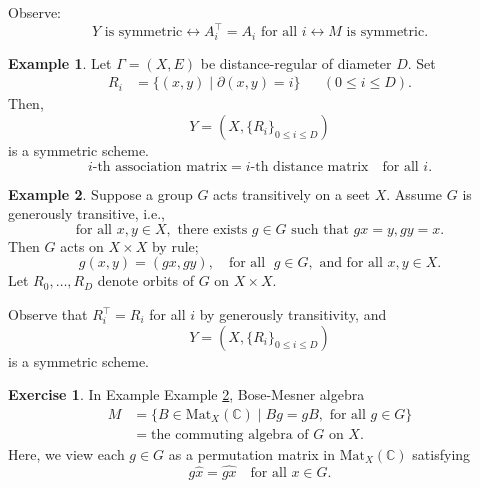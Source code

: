 \documentclass[
]{book}
\theoremstyle{definition}
\theoremstyle{definition}
\newtheorem{example}{Example}[chapter]
\theoremstyle{definition}
\newtheorem{exercise}{Exercise}[chapter]
\theoremstyle{definition}
\theoremstyle{remark}
\begin{document}
Observe:
\[Y \text{ is symmetric} \leftrightarrow A_i^\top = A_i \text{ for all } i \leftrightarrow M \text{ is symmetric}.\]

\begin{example}
\protect\hypertarget{exm:dr}{}\label{exm:dr}Let \(\Gamma = (X, E)\) be distance-regular of diameter \(D\). Set
\begin{align}
R_i & = \{(x,y)\mid \partial(x,y) = i\} && (0\leq i\leq D).
\end{align}
Then,
\[Y = (X, \{R_i\}_{0\leq i\leq D})\]
is a symmetric scheme.
\[i\text{-th association matrix} = i\text{-th distance matrix} \quad \text{for all $i$.}\]
\end{example}

\begin{example}
\protect\hypertarget{exm:gen-tr}{}\label{exm:gen-tr}Suppose a group \(G\) acts transitively on a seet \(X\). Assume \(G\) is generously transitive, i.e.,
\[\text{for all }x,y\in X, \text{ there exists }g\in G \text{ such that }gx = y, gy = x.\]
Then \(G\) acts on \(X\times X\) by rule;
\[g(x,y) = (gx, gy), \quad \text{for all }\; g\in G, \text{ and for all }x,y\in X.\]
Let \(R_0, \ldots, R_D\) denote orbits of \(G\) on \(X\times X\).

Observe that \(R_i^\top = R_i\) for all \(i\) by generously transitivity, and
\[Y = (X, \{R_i\}_{0\leq i\leq D})\]
is a symmetric scheme.
\end{example}

\begin{exercise}
\protect\hypertarget{exr:gen-tr-case}{}\label{exr:gen-tr-case}In Example Example \ref{exm:gen-tr}, Bose-Mesner algebra
\begin{align}
M & = \{B\in \mathrm{Mat}_X(\mathbb{C}) \mid Bg = gB, \text{ for all }g\in G\}\\
& = \text{the commuting algebra of $G$ on $X$.}
\end{align}
Here, we view each \(g\in G\) as a permutation matrix in \(\mathrm{Mat}_X(\mathbb{C})\) satisfying
\[g\hat{x} = \widehat{gx} \quad \text{for all }x\in G.\]
\end{exercise}
\end{document}
